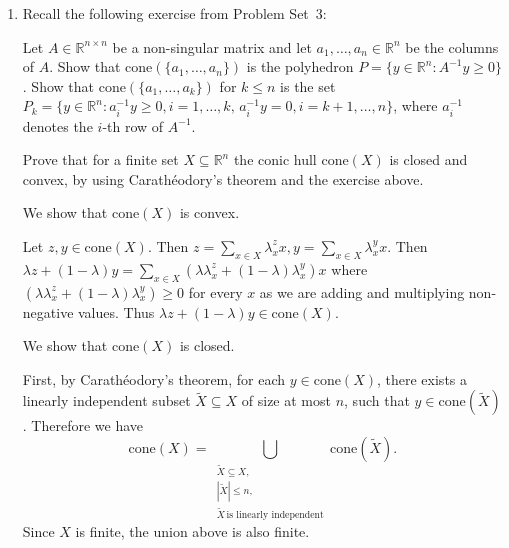 \documentclass[11pt]{article}
\institute{\'Ecole Polytechnique F\'ed\'erale de Lausanne}
\newcommand{\setR}{\mathbb{R}}
\renewcommand{\leq}{\leqslant}
\renewcommand{\geq}{\geqslant}
\newcommand{\cone}{\mathrm{cone}}
\begin{document}
\makeheader

\begin{enumerate}[1)]


\item Recall the following exercise from Problem Set~3:

	Let $A \in \setR^{n\times n}$ be a non-singular matrix and let
	$a_1,\ldots,a_n\in \setR^n$ be the columns of $A$.  Show that
	$\cone(\{a_1,\ldots,a_n\})$ is the polyhedron $P = \{ y \in \setR^n \colon
	A^{-1} y\geq0\}$. \label{conv:item:3} Show that $\cone(\{a_1,\ldots,a_k\})$ for
	$k\leq n$ is the set $P_k = \{y \in \setR^n \colon
	a_i^{-1} y\geq0, i=1,\ldots,k, \, a_i^{-1}y = 0, i=k+1,\ldots,n\}$, where
	$a_i^{-1}$ denotes the $i$-th row of $A^{-1}$. 

Prove that for a finite set $X\subseteq\setR^n$ the conic hull $\cone(X)$ is closed and convex, by using Carath\'eodory's theorem and the exercise above.

\begin{solution}
We show that $\cone(X)$ is convex. 


Let $z, y \in \cone(X)$. Then $z = \displaystyle\sum_{x \in X}\lambda_x^z x, y = \displaystyle\sum_{x \in X}\lambda_x^y x$. Then $\lambda z + (1-\lambda)y = \displaystyle\sum_{x \in X}(\lambda \lambda_x^z + (1-\lambda) \lambda_x^y) x$ where $(\lambda \lambda_x^z + (1-\lambda) \lambda_x^y) \geq 0$ for every $x$ as we are adding and multiplying non-negative values. Thus $\lambda z + (1-\lambda)y \in \cone(X)$. 


We show that $\cone(X)$ is closed. 


First, by Carath\'eodory's theorem, for each $y \in \cone(X)$, there exists a linearly independent subset $\tilde{X} \subseteq X$ of size at most $n$, such that $y \in \cone(\tilde{X})$. Therefore we have
\[\cone(X) = \bigcup_{\substack{\tilde{X} \subseteq X, \\ |\tilde{X}| \leq n, \\ \tilde{X}\,\text{is linearly independent}}} \cone(\tilde{X}).\]
Since $X$ is finite, the union above is also finite. 


\end{solution}
\end{enumerate}
\end{document}
